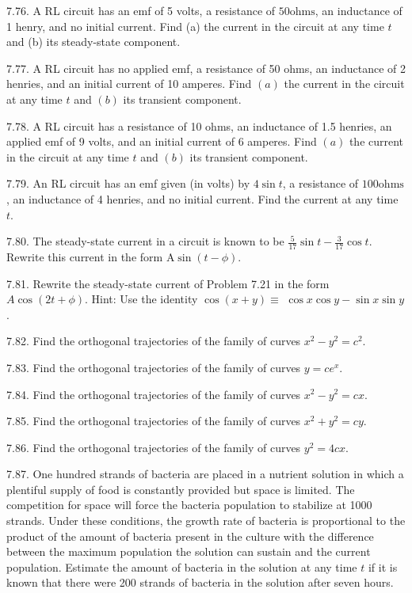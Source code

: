 \documentclass[10pt]{article}
\begin{document}
7.76. A RL circuit has an emf of 5 volts, a resistance of $50 \mathrm{ohms}$, an inductance of 1 henry, and no initial current. Find (a) the current in the circuit at any time $t$ and (b) its steady-state component.

7.77. A RL circuit has no applied emf, a resistance of 50 ohms, an inductance of 2 henries, and an initial current of 10 amperes. Find $(a)$ the current in the circuit at any time $t$ and $(b)$ its transient component.

7.78. A RL circuit has a resistance of 10 ohms, an inductance of 1.5 henries, an applied emf of 9 volts, and an initial current of 6 amperes. Find $(a)$ the current in the circuit at any time $t$ and $(b)$ its transient component.

7.79. An RL circuit has an emf given (in volts) by $4 \sin t$, a resistance of $100 \mathrm{ohms}$, an inductance of 4 henries, and no initial current. Find the current at any time $t$.

7.80. The steady-state current in a circuit is known to be $\frac{5}{17} \sin t-\frac{3}{17} \cos t$. Rewrite this current in the form $\mathrm{A} \sin (t-\phi)$.

7.81. Rewrite the steady-state current of Problem 7.21 in the form $A \cos (2 t+\phi)$. Hint: Use the identity $\cos (x+y) \equiv$ $\cos x \cos y-\sin x \sin y$.

7.82. Find the orthogonal trajectories of the family of curves $x^{2}-y^{2}=c^{2}$.

7.83. Find the orthogonal trajectories of the family of curves $y=c e^{x}$.

7.84. Find the orthogonal trajectories of the family of curves $x^{2}-y^{2}=c x$.

7.85. Find the orthogonal trajectories of the family of curves $x^{2}+y^{2}=c y$.

7.86. Find the orthogonal trajectories of the family of curves $y^{2}=4 c x$.

7.87. One hundred strands of bacteria are placed in a nutrient solution in which a plentiful supply of food is constantly provided but space is limited. The competition for space will force the bacteria population to stabilize at 1000 strands. Under these conditions, the growth rate of bacteria is proportional to the product of the amount of bacteria present in the culture with the difference between the maximum population the solution can sustain and the current population. Estimate the amount of bacteria in the solution at any time $t$ if it is known that there were 200 strands of bacteria in the solution after seven hours.
\end{document}
